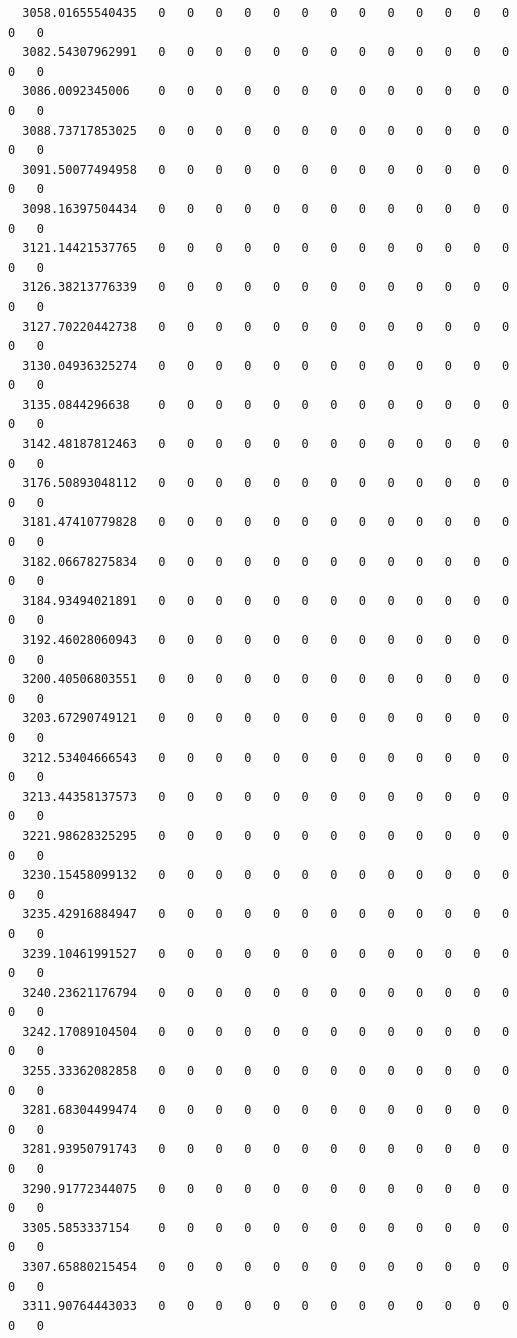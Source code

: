 \documentclass[
  letterpaper,
  DIV=11,
  numbers=noendperiod]{scrartcl}
\begin{document}
\begin{verbatim}
  3058.01655540435   0   0   0   0   0   0   0   0   0   0   0   0   0   0   0
  3082.54307962991   0   0   0   0   0   0   0   0   0   0   0   0   0   0   0
  3086.0092345006    0   0   0   0   0   0   0   0   0   0   0   0   0   0   0
  3088.73717853025   0   0   0   0   0   0   0   0   0   0   0   0   0   0   0
  3091.50077494958   0   0   0   0   0   0   0   0   0   0   0   0   0   0   0
  3098.16397504434   0   0   0   0   0   0   0   0   0   0   0   0   0   0   0
  3121.14421537765   0   0   0   0   0   0   0   0   0   0   0   0   0   0   0
  3126.38213776339   0   0   0   0   0   0   0   0   0   0   0   0   0   0   0
  3127.70220442738   0   0   0   0   0   0   0   0   0   0   0   0   0   0   0
  3130.04936325274   0   0   0   0   0   0   0   0   0   0   0   0   0   0   0
  3135.0844296638    0   0   0   0   0   0   0   0   0   0   0   0   0   0   0
  3142.48187812463   0   0   0   0   0   0   0   0   0   0   0   0   0   0   0
  3176.50893048112   0   0   0   0   0   0   0   0   0   0   0   0   0   0   0
  3181.47410779828   0   0   0   0   0   0   0   0   0   0   0   0   0   0   0
  3182.06678275834   0   0   0   0   0   0   0   0   0   0   0   0   0   0   0
  3184.93494021891   0   0   0   0   0   0   0   0   0   0   0   0   0   0   0
  3192.46028060943   0   0   0   0   0   0   0   0   0   0   0   0   0   0   0
  3200.40506803551   0   0   0   0   0   0   0   0   0   0   0   0   0   0   0
  3203.67290749121   0   0   0   0   0   0   0   0   0   0   0   0   0   0   0
  3212.53404666543   0   0   0   0   0   0   0   0   0   0   0   0   0   0   0
  3213.44358137573   0   0   0   0   0   0   0   0   0   0   0   0   0   0   0
  3221.98628325295   0   0   0   0   0   0   0   0   0   0   0   0   0   0   0
  3230.15458099132   0   0   0   0   0   0   0   0   0   0   0   0   0   0   0
  3235.42916884947   0   0   0   0   0   0   0   0   0   0   0   0   0   0   0
  3239.10461991527   0   0   0   0   0   0   0   0   0   0   0   0   0   0   0
  3240.23621176794   0   0   0   0   0   0   0   0   0   0   0   0   0   0   0
  3242.17089104504   0   0   0   0   0   0   0   0   0   0   0   0   0   0   0
  3255.33362082858   0   0   0   0   0   0   0   0   0   0   0   0   0   0   0
  3281.68304499474   0   0   0   0   0   0   0   0   0   0   0   0   0   0   0
  3281.93950791743   0   0   0   0   0   0   0   0   0   0   0   0   0   0   0
  3290.91772344075   0   0   0   0   0   0   0   0   0   0   0   0   0   0   0
  3305.5853337154    0   0   0   0   0   0   0   0   0   0   0   0   0   0   0
  3307.65880215454   0   0   0   0   0   0   0   0   0   0   0   0   0   0   0
  3311.90764443033   0   0   0   0   0   0   0   0   0   0   0   0   0   0   0
                  

\end{verbatim}
\end{document}
